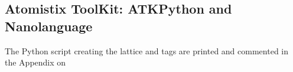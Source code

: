 \subsection{Atomistix ToolKit: ATKPython and Nanolanguage}
The Python script creating the lattice and tags are printed and commented in the Appendix on 
